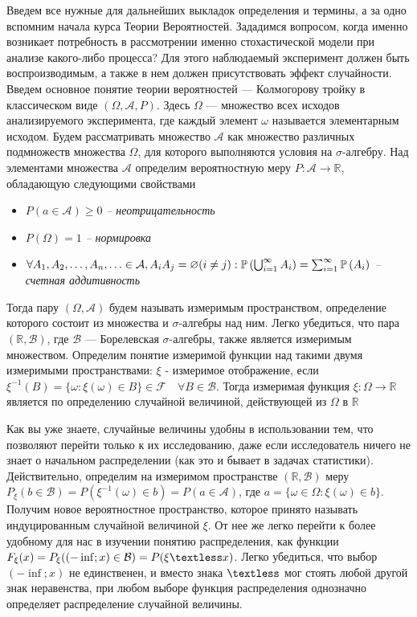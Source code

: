 \documentclass{article}
\begin{document}
\begin{multicols}{2}
        Введем все нужные для дальнейших выкладок определения и термины, а за одно вспомним начала курса Теории Вероятностей. Зададимся вопросом, когда именно возникает потребность в рассмотрении именно стохастической модели при анализе какого-либо процесса? Для этого наблюдаемый эксперимент должен быть воспроизводимым, а также в нем должен присутствовать эффект случайности. Введем основное понятие теории вероятностей — Колмогорову тройку в классическом виде $(\Omega, \mathcal{A}, P)$. Здесь $\Omega$ — множество всех исходов анализируемого эксперимента, где каждый элемент $\omega$ называется элементарным исходом. Будем рассматривать множество $\mathcal{A}$ как множество различных подмножеств множества $\Omega$, для которого выполняются условия на $\sigma$-алгебру. Над элементами множества $\mathcal{A}$ определим вероятностную меру $P: \mathcal{A} \longrightarrow \mathds{R}$, обладающую следующими свойствами
        \begin{itemize}
            \item $P(a \in \mathcal{A}) \geqslant 0$ \textit{-- неотрицательность}
            \item $P(\Omega) = 1$ \textit{-- нормировка}
            \item $\forall A_1, A_2, \ldots, A_n, \ldots \in \mathcal{A}, \\  A_i A_j=\varnothing(i \neq j): \mathbb{P}\left(\bigcup_{i=1}^{\infty} A_i\right)=\sum_{i=1}^{\infty} \mathbb{P}\left(A_i\right)$ \textit{-- счетная аддитивность}
        \end{itemize}
        
        Тогда пару $(\Omega, \mathcal{A})$ будем называть измеримым пространством, определение которого состоит из множества и $\sigma$-алгебры над ним. Легко убедиться, что пара $(\mathds{R}, \mathcal{B})$, где $\mathcal{B}$ — Борелевская $\sigma$-алгебры, также является измеримым множеством. Определим понятие измеримой функции над такими двумя измеримыми пространствами: $\xi$ - измеримое отображение, если $\xi^{-1}(B)=\{\omega: \xi(\omega) \in B\} \in \mathcal{F} \quad \forall B \in \mathcal{B}$. Тогда измеримая функция $\xi: \Omega \longrightarrow \mathds{R}$ является по определению случайной величиной, действующей из $\Omega$ в $\mathds{R}$

        Как вы уже знаете, случайные величины удобны в использовании тем, что позволяют перейти только к их исследованию, даже если исследователь ничего не знает о начальном распределении (как это и бывает в задачах статистики). Действительно, определим на измеримом пространстве $(\mathds{R}, \mathcal{B})$ меру $P_{\xi}(b \in \mathcal{B}) = P({\xi^{-1}(\omega) \in b})=P(a \in \mathcal{A})$, где $a = \{\omega \in \Omega: \xi(\omega) \in b\}$. Получим новое вероятностное пространство, которое принято называть индуцированным случайной величиной $\xi$. 
        От нее же легко перейти к более удобному для нас в изучении понятию распределения, как функции $F_{\xi}(x)=P_{\xi}((-\inf; x) \in \mathcal{B}) = P(\xi \textless x)$. Легко убедиться, что выбор $(-\inf; x)$ не единственен, и вместо знака $\textless$ мог стоять любой другой знак неравенства, при любом выборе функция распределения однозначно определяет распределение случайной величины.


\end{multicols}
\end{document}
